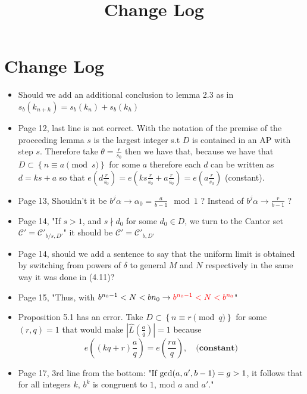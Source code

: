 \documentclass[12pt,leqno]{amsart}
\title{Change Log}
\numberwithin{equation}{section}
\numberwithin{counter2}{section}
\theoremstyle{definition}
\theoremstyle{plain}
\begin{document}
	
	\section{Change Log}
	\begin{itemize}
		\item[1)] Should we add an additional conclusion to lemma 2.3 as in $s_b(k_{n+h})=s_{b}(k_n)+s_b(k_h)$
		\item[2)] Page 12, last line is not correct. With the notation of the premise of the proceeding lemma $s$ is the largest integer s.t $D$ is contained in an AP with step $s.$ Therefore take $\theta=\frac{r}{s_0}$ then we have that, because we have that $D \subset \left\{ n \equiv a \pmod{s} \right\}$ for some $a$ therefore each $d$ can be written as $d=ks+a$ so that $e(d \frac{r}{s_0})=e(ks \frac{r}{s_0} +a\frac{r}{s_0})=e( a \frac{r}{s_0} )$ (constant).
		\item[3)] Page 13, Shouldn't  it be $b^j \alpha \to  \alpha_0=\frac{a}{b-1} \mod{1}$ ? Instead of $b^j \alpha \to  \frac{r}{b-1} $ ? 
		\item[4)] Page 14, "If $s>1$, and $s\nmid d_0$ for some $d_0\in D$, we turn to the Cantor set $\mathcal C ' = \mathcal C'_{b/s, D'}$"  it should be {\color{red}$\mathcal C ' = \mathcal C'_{b, D'}$}
		\item[5)] Page 14, should we add a sentence to say that the uniform limit is obtained by switching from powers of $\delta$ to general $M$ and $N$  respectively in the same way it was done in (4.11)?
		\item[6)] Page 15, "Thus, with $b ^{n_0-1}<N<b{n_0} \to {\color{red} b ^{n_0-1}<N<b^{n_0} } $"
		\item[7)] Proposition 5.1 has an error. Take $D \subset \left\{  n \equiv r \pmod{q}\right\}$ for some $(r,q)=1$ that would make $|\widehat{L}(\frac{a}{q})|=1$ because \[ e(\left(kq+r\right)\frac{a}{q})=e(\frac{ra}{q}), \quad \textbf{(constant)} \]
		\item[8)] Page 17, 3rd line from the bottom: "If $\textup{gcd}(a,a',b-1)=g>1$, it follows that for all integers $k$,  $b^k$ is congruent to $1$, mod $a$ and $a'$." 
		

\end{itemize}
\end{document}
